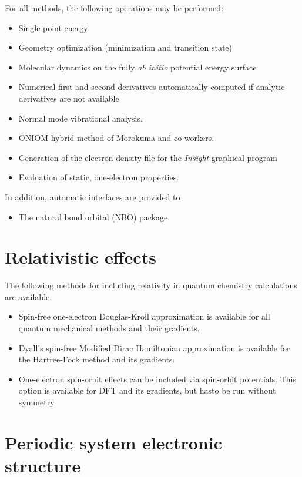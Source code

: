 For all methods, the following operations may be performed:
\begin{itemize}
\item Single point energy
\item Geometry optimization (minimization and transition state)
\item Molecular dynamics on the fully {\em ab initio} potential energy
  surface
\item Numerical first and second derivatives automatically computed if
  analytic derivatives are not available
\item Normal mode vibrational analysis.
\item ONIOM hybrid method of Morokuma and co-workers.
\item Generation of the electron density file for the {\em Insight}
      graphical program
\item Evaluation of static, one-electron properties.
\end{itemize}

In addition, automatic interfaces are provided to
\begin{itemize}
\item The natural bond orbital (NBO) package
\end{itemize}

\section{Relativistic effects}

The following methods for including relativity in quantum chemistry 
calculations are available:
\begin{itemize}
\item Spin-free one-electron Douglas-Kroll approximation is available for all 
 quantum mechanical methods and their gradients.
\item Dyall's spin-free Modified Dirac Hamiltonian approximation is available 
 for the Hartree-Fock method and its gradients.
\item One-electron spin-orbit effects can be included via spin-orbit potentials.
 This option is available for DFT and its gradients, but hasto be run without 
 symmetry.
\end{itemize}

\section{Periodic system electronic structure}

